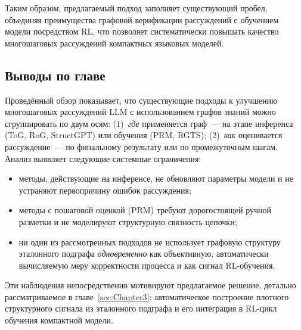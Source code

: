 Таким образом, предлагаемый подход заполняет существующий пробел, объединяя преимущества графовой верификации рассуждений с обучением модели посредством RL, что позволяет систематически повышать качество многошаговых рассуждений компактных языковых моделей.

\subsection{Выводы по главе}
\label{subsec:chapter2-conclusion}

Проведённый обзор показывает, что существующие подходы к улучшению многошаговых рассуждений LLM с использованием графов знаний можно сгруппировать по двум осям: (1)~\textit{где} применяется граф~--- на этапе инференса (ToG, RoG, StructGPT) или обучения (PRM, RGTS); (2)~\textit{как} оценивается рассуждение~--- по финальному результату или по промежуточным шагам. Анализ выявляет следующие системные ограничения:
\begin{itemize}
    \setlength{\itemsep}{\smallskipamount}
    \item методы, действующие на инференсе, не обновляют параметры модели и не устраняют первопричину ошибок рассуждения;
    \item методы с пошаговой оценкой (PRM) требуют дорогостоящей ручной разметки и не моделируют структурную связность цепочки;
    \item ни один из рассмотренных подходов не использует графовую структуру эталонного подграфа \emph{одновременно} как объективную, автоматически вычисляемую меру корректности процесса и как сигнал RL-обучения.
\end{itemize}
Эти наблюдения непосредственно мотивируют предлагаемое решение, детально рассматриваемое в главе~\ref{sec:Chapter3}: автоматическое построение плотного структурного сигнала из эталонного подграфа и его интеграция в RL-цикл обучения компактной модели.